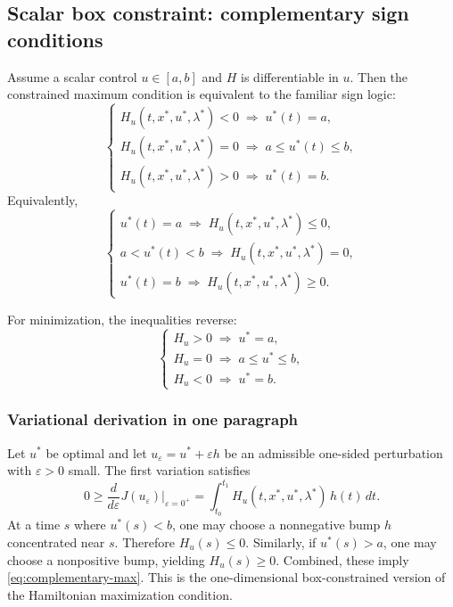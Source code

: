 \documentclass[11pt]{article}
\theoremstyle{definition}
\begin{document}
\subsection{Scalar box constraint: complementary sign conditions}

Assume a scalar control $u\in[a,b]$ and $H$ is differentiable in $u$.
Then the constrained maximum condition is equivalent to the familiar sign logic:
\begin{equation}
\label{eq:sign-conditions-max}
\begin{cases}
H_u(t,x^*,u^*,\lambda^*) < 0 \;\Rightarrow\; u^*(t)=a,\\[0.25em]
H_u(t,x^*,u^*,\lambda^*) = 0 \;\Rightarrow\; a\le u^*(t)\le b,\\[0.25em]
H_u(t,x^*,u^*,\lambda^*) > 0 \;\Rightarrow\; u^*(t)=b.
\end{cases}
\end{equation}
Equivalently,
\begin{equation}
\label{eq:complementary-max}
\begin{cases}
u^*(t)=a \;\Rightarrow\; H_u(t,x^*,u^*,\lambda^*)\le 0,\\[0.25em]
a<u^*(t)<b \;\Rightarrow\; H_u(t,x^*,u^*,\lambda^*)=0,\\[0.25em]
u^*(t)=b \;\Rightarrow\; H_u(t,x^*,u^*,\lambda^*)\ge 0.
\end{cases}
\end{equation}

For minimization, the inequalities reverse:
\begin{equation}
\label{eq:sign-conditions-min}
\begin{cases}
H_u > 0 \;\Rightarrow\; u^*=a,\\
H_u = 0 \;\Rightarrow\; a\le u^*\le b,\\
H_u < 0 \;\Rightarrow\; u^*=b.
\end{cases}
\end{equation}

\subsubsection{Variational derivation in one paragraph}

Let $u^*$ be optimal and let $u_\varepsilon=u^*+\varepsilon h$ be an admissible one-sided perturbation with $\varepsilon>0$ small. The first variation satisfies
\[
0 \ge \frac{d}{d\varepsilon}J(u_\varepsilon)\bigg|_{\varepsilon=0^+}
= \int_{t_0}^{t_1} H_u(t,x^*,u^*,\lambda^*)\, h(t)\,dt.
\]
At a time $s$ where $u^*(s)<b$, one may choose a nonnegative bump $h$ concentrated near $s$. Therefore $H_u(s)\le 0$. Similarly, if $u^*(s)>a$, one may choose a nonpositive bump, yielding $H_u(s)\ge 0$. Combined, these imply \eqref{eq:complementary-max}. This is the one-dimensional box-constrained version of the Hamiltonian maximization condition.
\end{document}
